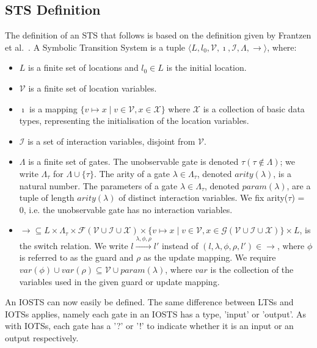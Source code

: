 \subsection{STS Definition}
The definition of an STS that follows is based on the definition given by Frantzen et al.~\cite{Frantzen:Symbolic}. A Symbolic Transition System is a tuple $\langle L,l_0,\mathcal{V},\imath,\mathcal{I},\Lambda,\rightarrow\rangle$, where:
\begin{itemize}
\item $L$ is a finite set of locations and $l_0 \in L$ is the initial location.
\item $\mathcal{V}$ is a finite set of location variables.
\item $\imath$ is a mapping $\{v \mapsto x \mid v \in \mathcal{V}, x \in \mathcal{X}\}$ where $\mathcal{X}$ is a collection of basic data types, representing the initialisation of the location variables.
\item $\mathcal{I}$ is a set of interaction variables, disjoint from $\mathcal{V}$.
\item $\Lambda$ is a finite set of gates. The unobservable gate is denoted $\tau (\tau \notin \Lambda)$; we write $\Lambda_\tau$ for $\Lambda \cup \{\tau\}$. The arity of a gate $\lambda\in\Lambda_\tau$, denoted $arity(\lambda)$, is a natural number. The parameters of a gate $\lambda\in\Lambda_\tau$, denoted $param(\lambda)$, are a tuple of length $arity(\lambda)$ of distinct interaction variables. We fix arity($\tau$) = 0, i.e. the unobservable gate has no interaction variables.
\item $\rightarrow \subseteq L \times \Lambda_\tau \times \mathcal{F}(\mathcal{V} \cup \mathcal{I} \cup \mathcal{X}) \times \{v \mapsto x \mid v \in \mathcal{V}, x \in \mathcal{G}(\mathcal{V} \cup \mathcal{I} \cup \mathcal{X})\} \times L$, is the switch relation. We write $l\xrightarrow{\lambda,\phi,\rho}l'$ instead of $(l,\lambda,\phi,\rho,l')\in\rightarrow$, where $\phi$ is referred to as the guard and $\rho$ as the update mapping. We require $var(\phi) \cup var(\rho) \subseteq \mathcal{V} \cup param(\lambda)$, where $var$ is the collection of the variables used in the given guard or update mapping.
\end{itemize}

An IOSTS can now easily be defined. The same difference between LTSs and IOTSs applies, namely each gate in an IOSTS has a type, 'input' or 'output'. As with IOTSs, each gate has a '?' or '!' to indicate whether it is an input or an output respectively.

